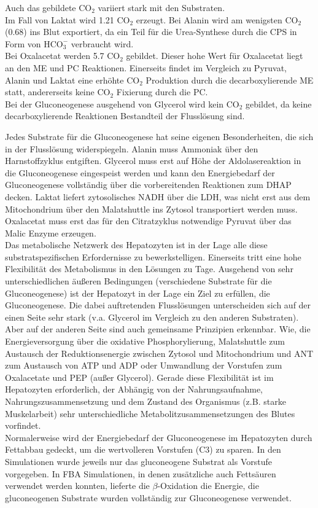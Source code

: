 Auch das gebildete $\text{CO}_2$ variiert stark mit den Substraten.\\
Im Fall von Laktat wird 1.21 $\text{CO}_2$ erzeugt. Bei Alanin wird am wenigsten $\text{CO}_2$ (0.68) ins Blut exportiert, da ein Teil für die Urea-Synthese durch die CPS in Form von $\text{HCO}_3^-$ verbraucht wird.\\
Bei Oxalacetat werden 5.7 $\text{CO}_2$ gebildet. Dieser hohe Wert für Oxalacetat liegt an den ME und PC Reaktionen. Einerseits findet im Vergleich zu Pyruvat, Alanin und Laktat eine erhöhte $\text{CO}_2$ Produktion durch die decarboxylierende ME statt, andererseits keine $\text{CO}_2$ Fixierung durch die PC.\\
Bei der Gluconeogenese ausgehend von Glycerol wird kein $\text{CO}_2$ gebildet, da keine decarboxylierende Reaktionen  Bestandteil der Flusslösung sind.

Jedes Substrate für die Gluconeogenese hat seine eigenen Besonderheiten, die sich in der Flusslösung widerspiegeln. Alanin muss Ammoniak über den Harnstoffzyklus entgiften. Glycerol muss erst auf Höhe der Aldolasereaktion in die Gluconeogenese eingespeist werden und kann den Energiebedarf der Gluconeogenese vollständig über die vorbereitenden Reaktionen zum DHAP decken. Laktat liefert zytosolisches NADH über die LDH, was nicht erst aus dem Mitochondrium über den Malatshuttle ins Zytosol transportiert werden muss. Oxalacetat muss erst das für den Citratzyklus notwendige Pyruvat über das Malic Enzyme erzeugen.\\
Das metabolische Netzwerk des Hepatozyten ist in der Lage alle diese substratspezifischen Erfordernisse zu bewerkstelligen. Einerseits tritt eine hohe Flexibilität des Metabolismus in den Lösungen zu Tage. Ausgehend von sehr unterschiedlichen äußeren Bedingungen (verschiedene Substrate für die Gluconeogenese) ist der Hepatozyt in der Lage ein Ziel zu erfüllen, die Gluconeogenese. Die dabei auftretenden Flusslösungen unterscheiden sich auf der einen Seite sehr stark (v.a. Glycerol im Vergleich zu den anderen Substraten). Aber auf der anderen Seite sind auch gemeinsame Prinzipien erkennbar. Wie, die Energieversorgung über die oxidative Phosphorylierung, Malatshuttle zum Austausch der Reduktionsenergie zwischen Zytosol und Mitochondrium und ANT zum Austausch von ATP und ADP oder Umwandlung der Vorstufen zum Oxalacetate und PEP (außer Glycerol). Gerade diese Flexibilität ist im Hepatozyten erforderlich, der Abhängig von der Nahrungsaufnahme, Nahrungszusammensetzung und dem Zustand des Organismus (z.B. starke Muskelarbeit) sehr unterschiedliche Metabolitzusammensetzungen des Blutes vorfindet.\\
Normalerweise wird der Energiebedarf der Gluconeogenese im Hepatozyten durch Fettabbau gedeckt, um die wertvolleren Vorstufen (C3) zu sparen. In den Simulationen wurde jeweils nur das gluconeogene Substrat als Vorstufe vorgegeben. In FBA Simulationen, in denen zusätzliche auch Fettsäuren verwendet werden konnten, lieferte die $\beta$-Oxidation die Energie, die gluconeogenen Substrate wurden vollständig zur Gluconeogenese verwendet.


